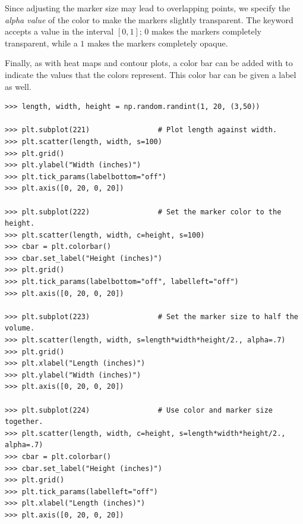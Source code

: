 Since adjusting the marker size may lead to overlapping points, we specify the \emph{alpha value} of the color to make the markers slightly transparent.
The keyword  accepts a value in the interval $[0,1]$; 0 makes the markers completely transparent, while a $1$ makes the markers completely opaque.

Finally, as with heat maps and contour plots, a color bar can be added with  to indicate the values that the colors represent.
This color bar can be given a label as well.

\begin{lstlisting}
>>> length, width, height = np.random.randint(1, 20, (3,50))

>>> plt.subplot(221)                # Plot length against width.
>>> plt.scatter(length, width, s=100)
>>> plt.grid()
>>> plt.ylabel("Width (inches)")
>>> plt.tick_params(labelbottom="off")
>>> plt.axis([0, 20, 0, 20])

>>> plt.subplot(222)                # Set the marker color to the height.
>>> plt.scatter(length, width, c=height, s=100)
>>> cbar = plt.colorbar()
>>> cbar.set_label("Height (inches)")
>>> plt.grid()
>>> plt.tick_params(labelbottom="off", labelleft="off")
>>> plt.axis([0, 20, 0, 20])

>>> plt.subplot(223)                # Set the marker size to half the volume.
>>> plt.scatter(length, width, s=length*width*height/2., alpha=.7)
>>> plt.grid()
>>> plt.xlabel("Length (inches)")
>>> plt.ylabel("Width (inches)")
>>> plt.axis([0, 20, 0, 20])

>>> plt.subplot(224)                # Use color and marker size together.
>>> plt.scatter(length, width, c=height, s=length*width*height/2., alpha=.7)
>>> cbar = plt.colorbar()
>>> cbar.set_label("Height (inches)")
>>> plt.grid()
>>> plt.tick_params(labelleft="off")
>>> plt.xlabel("Length (inches)")
>>> plt.axis([0, 20, 0, 20])
\end{lstlisting}

